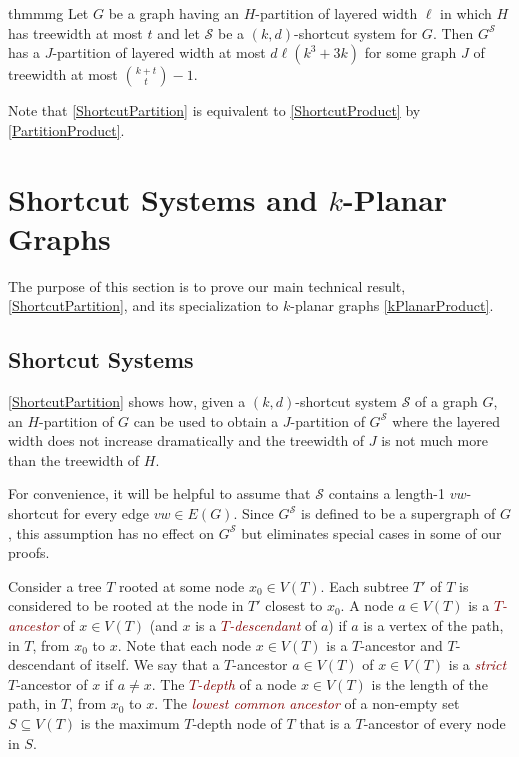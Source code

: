 \documentclass{patmorin}
\theoremstyle{plain}
\theoremstyle{definition}
\newcommand{\defin}[1]{\textcolor{Maroon}{\emph{#1}}}
\renewcommand{\SS}{\mathcal{S}}
\begin{document}
\begin{restatable}{thm}{mmg}
	\label{ShortcutPartition}
	Let $G$ be a graph having an $H$-partition of layered width $\ell$ in which $H$ has treewidth at most $t$ and let $\SS$ be a $(k,d)$-shortcut system for $G$.  Then $G^\SS$ has a $J$-partition of layered width at most $d\ell(k^3+3k)$ for some graph $J$ of treewidth at most $\binom{k+t}{t}-1$.
\end{restatable}

Note that \cref{ShortcutPartition} is equivalent to \cref{ShortcutProduct} by \cref{PartitionProduct}.



\section{\boldmath Shortcut Systems and $k$-Planar Graphs}
\label{Structure}

The purpose of this section is to prove our main technical result, \cref{ShortcutPartition}, and its specialization to $k$-planar graphs \cref{kPlanarProduct}.


\subsection{Shortcut Systems}

\cref{ShortcutPartition} shows how, given a $(k,d)$-shortcut system $\SS$ of a graph $G$, an $H$-partition of $G$ can be used to obtain a $J$-partition of $G^{\SS}$ where the layered width  does not increase dramatically and the treewidth of $J$ is not much more than the treewidth of $H$.

For convenience, it will be helpful to assume that $\SS$ contains a length-1 $vw$-shortcut for every edge $vw\in E(G)$.  Since $G^\SS$ is defined to be a supergraph of $G$, this assumption has no effect on $G^{\SS}$ but eliminates special cases in some of our proofs.

Consider a tree $T$ rooted at some node $x_0\in V(T)$. Each subtree $T'$ of $T$ is considered to be rooted at the node in $T'$ closest to $x_0$. A node $a\in V(T)$ is a \defin{$T$-ancestor} of $x\in V(T)$ (and $x$ is a \defin{$T$-descendant} of $a$) if $a$ is a vertex of the path, in $T$, from $x_0$ to $x$.  Note that each node $x\in V(T)$ is a $T$-ancestor and $T$-descendant of itself.  We say that a $T$-ancestor $a\in V(T)$ of $x\in V(T)$ is a \defin{strict} $T$-ancestor of $x$ if $a\neq x$.
The \defin{$T$-depth} of a node $x\in V(T)$ is the length of the path, in $T$, from $x_0$ to $x$.  The \defin{lowest common ancestor} of a non-empty set $S\subseteq V(T)$ is the maximum $T$-depth node of $T$ that is a $T$-ancestor of every node in $S$.
\end{document}
